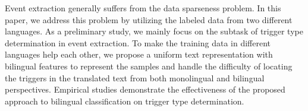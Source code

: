 Event extraction generally suffers from the data sparseness problem. In this paper, we address this problem by utilizing the labeled data from two different languages. As a preliminary study, we mainly focus on the subtask of trigger type determination in event extraction. To make the training data in different languages help each other, we propose a uniform text representation with bilingual features to represent the samples and handle the difficulty of locating the triggers in the translated text from both monolingual and bilingual perspectives. Empirical studies demonstrate the effectiveness of the proposed approach to bilingual classification on trigger type determination.
